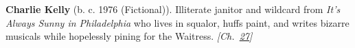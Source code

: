 \textbf{Charlie Kelly} (b. c. 1976 (Fictional)). Illiterate janitor and wildcard from \emph{It's Always Sunny in Philadelphia} who lives in squalor, huffs paint, and writes bizarre musicals while hopelessly pining for the Waitress. \emph{[Ch.~\hyperref[ch:planetaryskycolors]{27}]}

